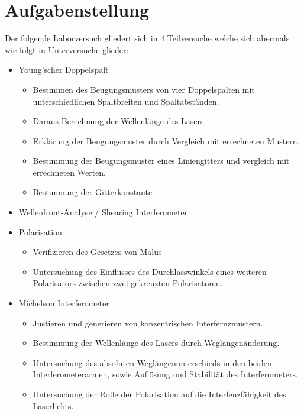 \documentclass[ngerman]{scrartcl}
\begin{document}
\section{Aufgabenstellung} %
\label{sec:aufgabenstellung}
Der folgende Laborversuch gliedert sich in 4 Teilversuche welche sich abermals wie folgt in Unterversuche glieder:
\begin{itemize}
    \item Young'scher Doppelspalt
    \begin{itemize}
        \item Bestimmen des Beugungsmusters von vier Doppelspalten mit unterschiedlichen Spaltbreiten und Spaltabständen. 
        \item Daraus Berechnung der Wellenlänge des Lasers.
        \item Erklärung der Beugungsmuster durch Vergleich mit errechneten Mustern.
        \item Bestimmung der Beugungsmuster eines Liniengitters und vergleich mit errechneten Werten. 
        \item Bestimmung der Gitterkonstante
    \end{itemize}
    \item Wellenfront-Analyse / Shearing Interferometer
    \item Polarisation
    \begin{itemize}
        \item Verifizieren des Gesetzes von Malus
        \item Untersuchung des Einflusses des Durchlasswinkels eines weiteren Polarisators zwischen zwei gekreuzten Polarisatoren. 
    \end{itemize}
    \item Michelson Interferometer
    \begin{itemize}
        \item Justieren und generieren von konzentrischen Interfernzmustern. 
        \item Bestimmung der Wellenlänge des Lasers durch Weglängenänderung. 
        \item Untersuchung des absoluten Weglängenunterschieds in den beiden Interferometerarmen, sowie Auflösung und Stabilität des Interferometers. 
        \item Untersuchung der Rolle der Polarisation auf die Interfenzfähigkeit des Laserlichts. 
    \end{itemize}
\end{itemize}
\end{document}
